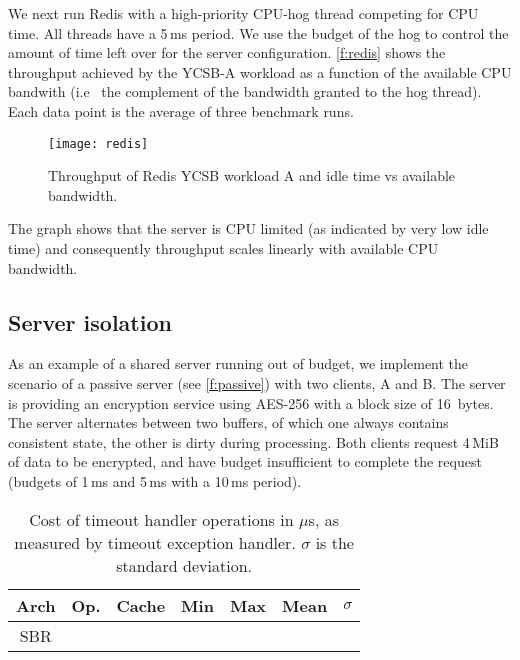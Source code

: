 We next run Redis with a high-priority CPU-hog thread competing for CPU time. All threads have a
5\,ms period. We use the budget of the hog to control the amount of time left over
for the server configuration. \autoref{f:redis} shows the throughput
achieved by the YCSB-A workload as a function of the available CPU
bandwith (i.e \ the complement of the bandwidth granted to the hog
thread). Each data point is the average of three benchmark runs.

\begin{figure}[b]
  \centering
  \texttt{[image: redis]}
  \caption{Throughput of Redis YCSB workload A and idle time vs available bandwidth.}
  \label{f:redis}
\end{figure}

The graph shows that the server is CPU limited (as indicated by very low idle time)
and consequently throughput scales linearly with available CPU
bandwidth.

\subsection{Server isolation} 

As an example of a shared server running out of budget, we implement
the scenario of a passive server (see \autoref{f:passive}) with two
clients, A and B. The server is providing an encryption service using AES-256
with a block size of 16~bytes. The server alternates between two
buffers, of which one always contains consistent state, the other is
dirty during processing. Both clients request 4\,MiB of data to be encrypted, and
have budget insufficient to complete the request (budgets of 1\,ms and
5\,ms with a 10\,ms period).

\begin{table}[t]\centering
\begin{tabular}{|c|l|l|r|r|r|r|}\hline
\textbf{Arch} & \textbf{Op.} & \textbf{Cache} & \textbf{Min} &
                          \textbf{Max} & \textbf{Mean} &
                          \multicolumn{1}{c|}{\boldmath \(\sigma\)} \\\hline
\multirow{8}{*}{SBR}  \hline
\multirow{8}{*}{x64}  \hline
\end{tabular}
\caption{Cost of timeout handler operations in \(\mu\)s, as measured
  by timeout exception handler. \(\sigma\) is the standard deviation.}
\label{t:rollback}
\end{table}

